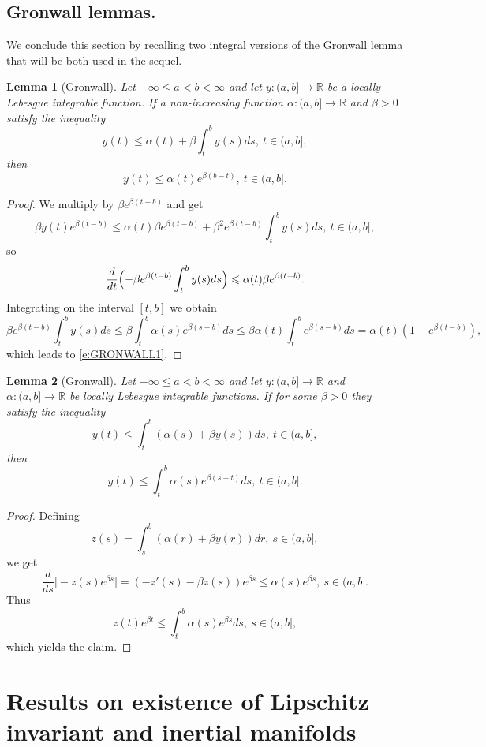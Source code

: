 \documentclass[a4paper,11pt,reqno]{amsart}
\theoremstyle{plain}
\newtheorem{lem}{Lemma}[section]
\theoremstyle{definition}
\numberwithin{equation}{section}
\newcommand{\R}{\mathbb{R}}
\renewcommand{\leq}{\leqslant}
\begin{document}
\subsection{Gronwall lemmas.} We conclude this section by recalling two integral versions of the Gronwall lemma that will be both used in the sequel.
\begin{lem}[Gronwall]
Let $-\infty\leq a<b<\infty$ and let $y\colon(a,b]\to\R$ be a locally Lebesgue integrable function. If  a non-increasing function $\alpha\colon(a,b]\to\R$ and $\beta>0$ satisfy the inequality
$$y(t)\leq\alpha(t)+\beta\int_{t}^{b}y(s)ds,\ t\in(a,b],$$
then
\begin{equation}\label{e:GRONWALL1}
y(t)\leq\alpha(t)e^{\beta(b-t)},\ t\in(a,b].
\end{equation} 
\end{lem}

\begin{proof}
We multiply by $\beta e^{\beta(t-b)}$ and get
$$\beta y(t)e^{\beta(t-b)}\leq\alpha(t)\beta e^{\beta(t-b)}+\beta^2 e^{\beta(t-b)}\int_{t}^{b}y(s)ds,\ t\in(a,b],$$
so
$$\frac{d}{dt}\Bigl(-\beta e^{\beta(t-b)}\int_{t}^{b}y(s)ds \Bigr)\leq\alpha(t)\beta e^{\beta(t-b)}.$$
Integrating on the interval $[t,b]$ we obtain
$$\beta e^{\beta(t-b)}\int_{t}^{b}y(s)ds \leq \beta\int_{t}^{b}\alpha(s)e^{\beta(s-b)}ds\leq \beta\alpha(t)\int_{t}^{b}e^{\beta(s-b)}ds=\alpha(t)(1-e^{\beta(t-b)}),$$
which leads to \eqref{e:GRONWALL1}.
\end{proof}

\begin{lem}[Gronwall]\label{lem:GRONWALL2}
Let $-\infty\leq a<b<\infty$ and let $y\colon(a,b]\to\R$ and $\alpha\colon(a,b]\to\R$ be locally Lebesgue integrable functions. If for some $\beta>0$ they satisfy the inequality
$$y(t)\leq\int_{t}^{b}(\alpha(s)+\beta y(s))ds,\ t\in(a,b],$$
then
$$y(t)\leq\int_{t}^{b}\alpha(s)e^{\beta(s-t)}ds,\ t\in(a,b].$$
\end{lem}

\begin{proof}
Defining
$$z(s)=\int_{s}^{b}(\alpha(r)+\beta y(r))dr,\ s\in(a,b],$$
we get
$$\frac{d}{ds}\bigl[-z(s)e^{\beta s}\bigr]=(-z'(s)-\beta z(s))e^{\beta s}\leq\alpha(s)e^{\beta s},\ s\in(a,b].$$
Thus
$$z(t)e^{\beta t}\leq\int_{t}^{b}\alpha(s)e^{\beta s}ds,\ s\in(a,b],$$
which yields the claim.
\end{proof}


\section{Results on existence of Lipschitz invariant and inertial manifolds}\label{sec:LIP}
\end{document}
